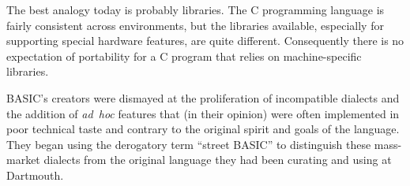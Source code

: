\begin{tangent}
The best analogy today is probably libraries.  The C programming
language is fairly consistent across environments, but the libraries
available, especially for supporting special hardware features, are
quite different.  Consequently there is no expectation of portability
for a C program 
that relies on machine-specific libraries.
\end{tangent}

BASIC's creators were dismayed at the proliferation of incompatible
dialects and the addition of \emph{ad~hoc} features that (in their
opinion) were
often implemented in poor technical taste and contrary to the original
spirit and goals of 
the language.  They began using the derogatory term ``street BASIC'' to
distinguish these mass-market dialects from the original language they
had been curating and using at Dartmouth.  
